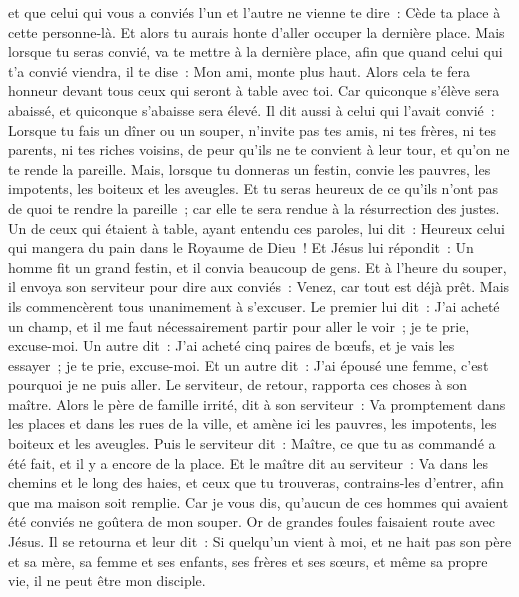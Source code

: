 \begin{multicols}{2}
et que celui qui vous a conviés l'un et l'autre ne vienne te dire~: Cède ta place à cette personne-là. Et alors tu aurais honte d'aller occuper la dernière place.
Mais lorsque tu seras convié, va te mettre à la dernière place, afin que quand celui qui t'a convié viendra, il te dise~: Mon ami, monte plus haut. Alors cela te fera honneur devant tous ceux qui seront à table avec toi.
Car quiconque s'élève sera abaissé, et quiconque s'abaisse sera élevé.
Il dit aussi à celui qui l'avait convié~: Lorsque tu fais un dîner ou un souper, n'invite pas tes amis, ni tes frères, ni tes parents, ni tes riches voisins, de peur qu'ils ne te convient à leur tour, et qu'on ne te rende la pareille.
Mais, lorsque tu donneras un festin, convie les pauvres, les impotents, les boiteux et les aveugles.
Et tu seras heureux de ce qu'ils n'ont pas de quoi te rendre la pareille~; car elle te sera rendue à la résurrection des justes.
Un de ceux qui étaient à table, ayant entendu ces paroles, lui dit~: Heureux celui qui mangera du pain dans le Royaume de Dieu~!
Et Jésus lui répondit~: Un homme fit un grand festin, et il convia beaucoup de gens.
Et à l'heure du souper, il envoya son serviteur pour dire aux conviés~: Venez, car tout est déjà prêt.
Mais ils commencèrent tous unanimement à s'excuser. Le premier lui dit~: J'ai acheté un champ, et il me faut nécessairement partir pour aller le voir~; je te prie, excuse-moi.
Un autre dit~: J'ai acheté cinq paires de bœufs, et je vais les essayer~; je te prie, excuse-moi.
Et un autre dit~: J'ai épousé une femme, c'est pourquoi je ne puis aller.
Le serviteur, de retour, rapporta ces choses à son maître. Alors le père de famille irrité, dit à son serviteur~: Va promptement dans les places et dans les rues de la ville, et amène ici les pauvres, les impotents, les boiteux et les aveugles.
Puis le serviteur dit~: Maître, ce que tu as commandé a été fait, et il y a encore de la place.
Et le maître dit au serviteur~: Va dans les chemins et le long des haies, et ceux que tu trouveras, contrains-les d'entrer, afin que ma maison soit remplie.
Car je vous dis, qu'aucun de ces hommes qui avaient été conviés ne goûtera de mon souper.
Or de grandes foules faisaient route avec Jésus. Il se retourna et leur dit~:
Si quelqu'un vient à moi, et ne hait pas son père et sa mère, sa femme et ses enfants, ses frères et ses sœurs, et même sa propre vie, il ne peut être mon disciple.

\end{multicols}
